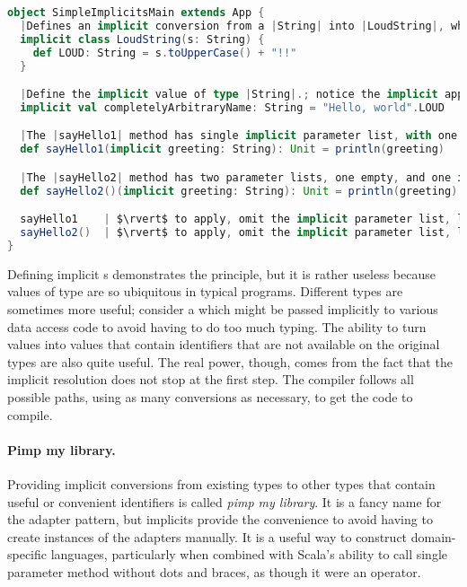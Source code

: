 \documentclass[10 pt]{article}
\begin{document}
\begin{lstlisting}[caption={Simple implicits}, label={code:implicits1}, language=Scala, escapechar=|]
object SimpleImplicitsMain extends App {
  |Defines an implicit conversion from a |String| into |LoudString|, which adds the method |LOUD|.|
  implicit class LoudString(s: String) {
    def LOUD: String = s.toUpperCase() + "!!"
  }

  |Define the implicit value of type |String|.; notice the implicit application of the |LoudString.LOUD|.|
  implicit val completelyArbitraryName: String = "Hello, world".LOUD

  |The |sayHello1| method has single implicit parameter list, with one parameter of type |String|.|
  def sayHello1(implicit greeting: String): Unit = println(greeting)

  |The |sayHello2| method has two parameter lists, one empty, and one implicit with one parameter of type |String|.|
  def sayHello2()(implicit greeting: String): Unit = println(greeting)

  sayHello1    | $\rvert$ to apply, omit the implicit parameter list, leaving just |sayHello1|.|
  sayHello2()  | $\rvert$ to apply, omit the implicit parameter list, leaving just |sayHello2()|.|
}
\end{lstlisting}

Defining implicit s demonstrates the principle, but it is rather useless because values of type  are so ubiquitous in typical programs. Different types are sometimes more useful; consider a  which might be passed implicitly to various data access code to avoid having to do too much typing. The ability to turn values into values that contain identifiers that are not available on the original types are also quite useful. The real power, though, comes from the fact that the implicit resolution does not stop at the first step. The compiler follows all possible paths, using as many conversions as necessary, to get the code to compile. 

\paragraph{Pimp my library.} Providing implicit conversions from existing types to other types that contain useful or convenient identifiers is called \emph{pimp my library}. It is a fancy name for the adapter pattern\cite{adapter-pattern}, but implicits provide the convenience to avoid having to create instances of the adapters manually. It is a useful way to construct domain-specific languages, particularly when combined with Scala's ability to call single parameter method without dots and braces, as though it were an operator.
\end{document}
